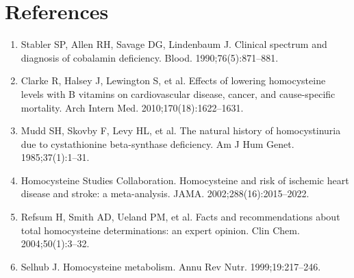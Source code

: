 \section*{References}
\begin{enumerate}
  \item Stabler SP, Allen RH, Savage DG, Lindenbaum J. Clinical spectrum and diagnosis of cobalamin deficiency. Blood. 1990;76(5):871--881.
  \item Clarke R, Halsey J, Lewington S, et al. Effects of lowering homocysteine levels with B vitamins on cardiovascular disease, cancer, and cause-specific mortality. Arch Intern Med. 2010;170(18):1622--1631.
  \item Mudd SH, Skovby F, Levy HL, et al. The natural history of homocystinuria due to cystathionine beta-synthase deficiency. Am J Hum Genet. 1985;37(1):1--31.
  \item Homocysteine Studies Collaboration. Homocysteine and risk of ischemic heart disease and stroke: a meta-analysis. JAMA. 2002;288(16):2015--2022.
  \item Refsum H, Smith AD, Ueland PM, et al. Facts and recommendations about total homocysteine determinations: an expert opinion. Clin Chem. 2004;50(1):3--32.
  \item Selhub J. Homocysteine metabolism. Annu Rev Nutr. 1999;19:217--246.
\end{enumerate}
\clearpage
